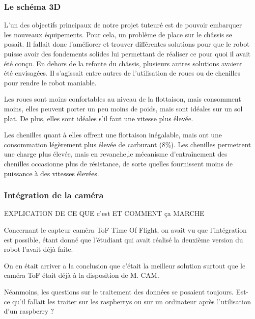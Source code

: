 \documentclass{PackagerQualityN}
\begin{document}
\subsubsection{Le schéma 3D}
L’un des objectifs principaux de notre projet tuteuré est de pouvoir embarquer les nouveaux équipements. Pour cela, un problème de place sur le châssis se posait. Il fallait donc l’améliorer et trouver différentes solutions pour que le robot puisse avoir des fondements solides lui permettant de réaliser ce pour quoi il avait été conçu. 
En dehors de la refonte du châssis, plusieurs autres solutions avaient été envisagées. Il s’agissait entre autres de l’utilisation de roues ou de chenilles pour rendre le robot maniable.

Les roues sont moins confortables au niveau de la flottaison, mais consomment moins, elles peuvent porter un peu moins de poids, mais sont idéales sur un sol plat. De plus, elles sont idéales s’il faut une vitesse plus élevée.

Les chenilles quant à elles offrent une flottaison inégalable, mais ont une consommation légèrement plus élevée de carburant (8\%). Les chenilles permettent une charge plus élevée, mais en revanche,le mécanisme d’entraînement des chenilles occasionne plus de résistance, de sorte quelles fournissent moins de puissance à des vitesses élevées.

\subsubsection{Intégration de la caméra}

EXPLICATION DE CE QUE c'est ET COMMENT ça MARCHE 


Concernant le capteur caméra ToF Time Of Flight, on avait vu que l’intégration est possible, étant donné que l’étudiant qui avait réalisé la deuxième version du robot l’avait déjà faite.



On en était arriver a la conclusion que c'était la meilleur solution surtout que le caméra ToF était déjà à la disposition de M. CAM.

Néanmoins, les questions sur le traitement des données se posaient toujours. Est-ce qu'il fallait les traiter sur les raspberrys ou sur un ordinateur après l’utilisation d’un raspberry ?   

\newp


\newp

\end{document}

